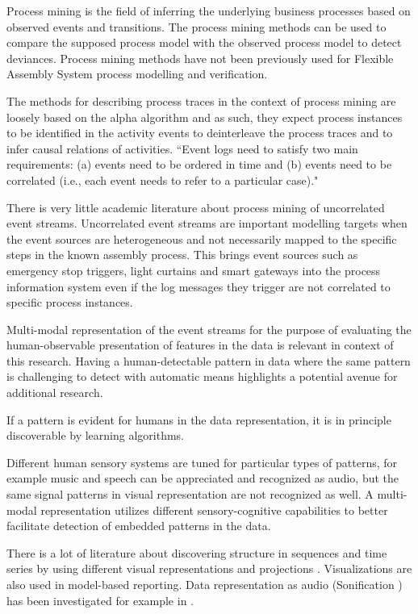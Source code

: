 \documentclass[a4paper,10pt]{article}
\begin{document}
Process mining is the field of inferring the underlying business processes based on observed events and transitions. The process mining methods can be used
to compare the supposed process model with the observed process model to detect deviances. Process mining methods have not been previously used for
Flexible Assembly System process modelling and verification.

The methods for describing process traces in the context of process mining are loosely based on the alpha algorithm\cite{van2004workflow} and as such, they expect process instances
to be identified in the activity events to deinterleave the process traces and to infer causal relations of activities.
``Event logs need to satisfy two main requirements: (a) events need to be ordered in time and (b) events need to be correlated
(i.e., each event needs to refer to a particular case)."\cite{van2011process}

There is very little academic literature about process mining of uncorrelated event streams. Uncorrelated event streams are important modelling targets when the event sources
are heterogeneous and not necessarily mapped to the specific steps in the known assembly process. This brings event sources such as emergency stop triggers, light curtains and
smart gateways into the process information system even if the log messages they trigger are not correlated to specific process instances.

Multi-modal representation of the event streams for the purpose of evaluating the human-observable presentation of features in the data is relevant in context of this research.
Having a human-detectable pattern in data where the same pattern is challenging to
detect with automatic means highlights a potential avenue for additional research.

If a pattern is evident for humans in the data representation, it is in principle discoverable by learning algorithms.

Different human sensory systems are tuned for particular types of patterns, for example music and speech
can be appreciated and recognized as audio, but the same signal patterns in visual representation are not recognized as well.
A multi-modal representation utilizes different sensory-cognitive capabilities to better facilitate detection of embedded patterns in the data.

There is a lot of literature about discovering structure in sequences and time series by using different visual representations and
projections \cite{hein2010recognition,misue2014chronoview}. Visualizations are also used in model-based reporting\cite{schuh2013ieee}.
Data representation as audio (Sonification \cite{refKra}) has been investigated for example in \cite{yeung1980pattern,kaper1999data}.
\end{document}
